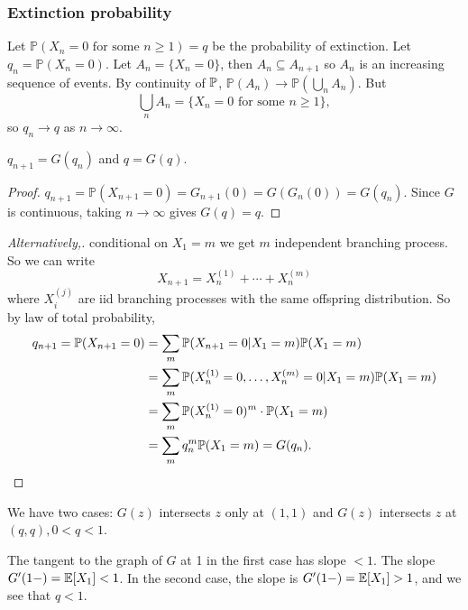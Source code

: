 \subsubsection*{Extinction probability} 
Let $ \mathbb{P}(X_n=0 \text{ for some }n\ge 1)=q $ be the probability of extinction. Let $ q_n=\mathbb{P}(X_n=0) $. Let $ A_n=\{X_n=0\} $, then $ A_n \subseteq A_{n+1} $ so $A_n$ is an increasing sequence of events. By continuity of ${\mathbb{P}}$, $ \mathbb{P}(A_n) \to \mathbb{P}\left( \bigcup_{n} A_n \right) $. But 
\[
    \bigcup_{n} A_n = \{X_n=0\text{ for some }n\ge 1\},
\]
so $ q_n\to q $ as $n\to \infty$.

\begin{claim}
    $ q_{n+1}=G(q_n) $ and $ q=G(q) $.
\end{claim}
\begin{proof}
    $ q_{n+1}=\mathbb{P}(X_{n+1}=0) = G_{n+1}(0) = G(G_{n}(0))=G(q_n) $. Since $G$ is continuous, taking $ n\to \infty $ gives $ G(q)=q $.
\end{proof}
\begin{proof}[Alternatively,]
    conditional on $X_1=m$ we get $m$ independent branching process. So we can write 
    \[
        X_{n+1}=X_n^{(1)}+ \cdots +X_n^{(m)}
    \]
    where $ X_i^{(j)} $ are iid branching processes with the same offspring distribution. So by law of total probability,
    \begin{align*}
        q_{n+1}={\mathbb{P}}(X_{n+1}=0)& = \sum_{m} {\mathbb{P}}(X_{n+1}=0|X_1=m){\mathbb{P}}(X_1=m)\\ 
        &= \sum_{m} {\mathbb{P}}(X_n^{(1)}=0,\dots,X_n^{(m)}=0|X_1=m){\mathbb{P}}(X_1=m)\\ 
        &= \sum_m {\mathbb{P}}(X_n^{(1)}=0)^m \cdot {\mathbb{P}}(X_1=m)\\ 
        &= \sum_m q_n^m{\mathbb{P}}(X_1=m) = G(q_n).\qedhere
    \end{align*}
\end{proof}
We have two cases: $G(z)$ intersects $z$ only at $(1,1)$ and $G(z)$ intersects $z$ at $ (q,q), 0<q<1 $.
\begin{center}
\end{center}
The tangent to the graph of $G$ at 1 in the first case has slope $ <1 $. The slope $ G'(1-)={\mathbb{E}}[X_1]<1 $. In the second case, the slope is $ G'(1-)={\mathbb{E}}[X_1]>1 $, and we see that $q<1$.

